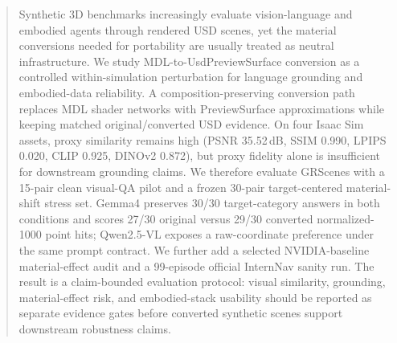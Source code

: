 \begin{abstract}
Synthetic 3D benchmarks increasingly evaluate vision-language and embodied
agents through rendered USD scenes, yet the material conversions needed for
portability are usually treated as neutral infrastructure. We study
MDL-to-UsdPreviewSurface conversion as a controlled within-simulation
perturbation for language grounding and embodied-data reliability. A
composition-preserving conversion path replaces MDL shader networks with
PreviewSurface approximations while keeping matched original/converted USD
evidence. On four Isaac Sim assets, proxy similarity remains high (PSNR
35.52\,dB, SSIM 0.990, LPIPS 0.020, CLIP 0.925, DINOv2 0.872), but proxy
fidelity alone is insufficient for downstream grounding claims. We therefore
evaluate GRScenes with a 15-pair clean visual-QA pilot and a frozen 30-pair
target-centered material-shift stress set. Gemma4 preserves 30/30
target-category answers in both conditions and scores 27/30 original versus
29/30 converted normalized-1000 point hits; Qwen2.5-VL exposes a
raw-coordinate preference under the same prompt contract. We further add a
selected NVIDIA-baseline
material-effect audit and a 99-episode official InternNav sanity run. The
result is a claim-bounded evaluation
protocol: visual similarity, grounding, material-effect risk, and embodied-stack
usability should be reported as separate evidence gates before converted
synthetic scenes support downstream robustness claims.
\end{abstract}
